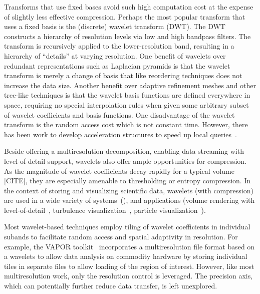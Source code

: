 Transforms that use fixed bases avoid such high computation cost at the expense of slightly less
effective compression. Perhaps the most popular transform that uses a fixed basis is the (discrete)
wavelet transform (DWT). The DWT constructs a hierarchy of resolution levels via low and high
bandpass filters. The transform is recursively applied to the lower-resolution band, resulting in a
hierarchy of ``details'' at varying resolution. One benefit of wavelets over redundant
representations such as Laplacian pyramids is that the wavelet transform is merely a change of basis
that like reordering techniques does not increase the data size. Another benefit over adaptive
refinement meshes and other tree-like techniques is that the wavelet basis functions are defined
everywhere in space, requiring no special interpolation rules when given some arbitrary subset of
wavelet coefficients and basis functions. One disadvantage of the wavelet transform is the random
access cost which is not constant time. However, there has been work to develop acceleration
structures to speed up local queries~\cite{weiss}.

Beside offering a multiresolution decomposition, enabling data streaming with level-of-detail
support, wavelets also offer ample opportunities for compression. As the magnitude of wavelet
coefficients decay rapidly for a typical volume [CITE], they are especially amenable to thresholding
or entropy compression. In the context of storing and visualizing scientific data, wavelets (with
compression) are used in a wide variety of
systems~(\cite{multires_toolkit2003,vapor2007,woodring2011}), and applications (volume rendering
with
level-of-detail~\cite{wavelet-compression-interactive-vis,multires-framework,rapid-compression-volume,interactive-rendering-large-volume,multires-volume-rendering},
turbulence visualization~\cite{treib}, particle visualization~\cite{sph-octree}).

Most wavelet-based techniques employ tiling of wavelet coefficients in individual subands to
facilitate random access and spatial adaptivity in resolution. For example, the VAPOR
toolkit~\cite{vapor2007} incorporates a multiresolution file format based on a wavelets to allow
data analysis on commodity hardware by storing individual tiles in separate files to allow loading
of the region of interest. However, like most multiresolution work, only the resolution control is
leveraged. The precision axis, which can potentially further reduce data transfer, is left
unexplored.


